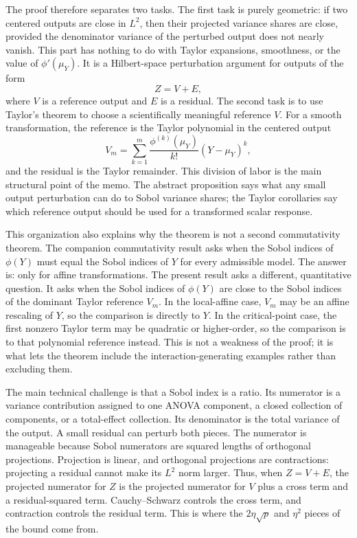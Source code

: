 \documentclass[11pt,letterpaper]{article}
\theoremstyle{remark}
\begin{document}
The proof therefore separates two tasks. The first task is purely geometric: if
two centered outputs are close in $L^2$, then their projected variance shares are
close, provided the denominator variance of the perturbed output does not nearly
vanish. This part has nothing to do with Taylor expansions, smoothness, or the
value of $\phi'(\mu_Y)$. It is a Hilbert-space perturbation argument for outputs
of the form
\begin{equation}
  Z=V+E,
\end{equation}
where $V$ is a reference output and $E$ is a residual. The second task is to use
Taylor's theorem to choose a scientifically meaningful reference $V$. For a
smooth transformation, the reference is the Taylor polynomial in the centered
output
\begin{equation}
  V_m=\sum_{k=1}^{m}\frac{\phi^{(k)}(\mu_Y)}{k!}(Y-\mu_Y)^k,
\end{equation}
and the residual is the Taylor remainder. This division of labor is the main
structural point of the memo. The abstract proposition says what any small
output perturbation can do to Sobol variance shares; the Taylor corollaries say
which reference output should be used for a transformed scalar response.

This organization also explains why the theorem is not a second commutativity
theorem. The companion commutativity result asks when the Sobol indices of
$\phi(Y)$ must equal the Sobol indices of $Y$ for every admissible model. The
answer is: only for affine transformations. The present result asks a different,
quantitative question. It asks when the Sobol indices of $\phi(Y)$ are close to
the Sobol indices of the dominant Taylor reference $V_m$. In the local-affine
case, $V_m$ may be an affine rescaling of $Y$, so the comparison is directly to
$Y$. In the critical-point case, the first nonzero Taylor term may be quadratic
or higher-order, so the comparison is to that polynomial reference instead. This
is not a weakness of the proof; it is what lets the theorem include the
interaction-generating examples rather than excluding them.

The main technical challenge is that a Sobol index is a ratio. Its numerator is
a variance contribution assigned to one ANOVA component, a closed collection of
components, or a total-effect collection. Its denominator is the total variance
of the output. A small residual can perturb both pieces. The numerator is
manageable because Sobol numerators are squared lengths of orthogonal
projections. Projection is linear, and orthogonal projections are contractions:
projecting a residual cannot make its $L^2$ norm larger. Thus, when
$Z=V+E$, the projected numerator for $Z$ is the projected numerator for $V$ plus
a cross term and a residual-squared term. Cauchy--Schwarz controls the cross
term, and contraction controls the residual term. This is where the
$2\eta\sqrt{p}$ and $\eta^2$ pieces of the bound come from.
\end{document}
